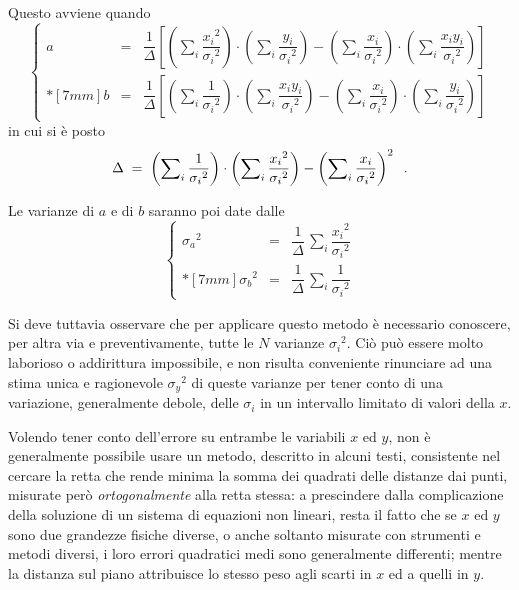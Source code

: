 Questo avviene quando
\begin{equation*}
  \left \{ \begin{array}{ccl}
    a & = & \dfrac{1}{\Delta}
      \left[ \left( \sum \nolimits_i
      \dfrac{{x_i}^2}{{\sigma_i}^2} \right)
      \cdot \left( \sum \nolimits_i
      \dfrac{y_i}{{\sigma_i}^2} \right) -
      \left( \sum \nolimits_i
      \dfrac{x_i}{{\sigma_i}^2} \right)
      \cdot \left( \sum \nolimits_i
      \dfrac{x_i y_i}{{\sigma_i}^2}
      \right) \right] \\*[7mm]
    b & = & \dfrac{1}{\Delta}
      \left[ \left( \sum \nolimits_i
      \dfrac{1}{{\sigma_i}^2} \right) \cdot
      \left( \sum \nolimits_i
      \dfrac{x_i y_i}{{\sigma_i}^2} \right)
      - \left( \sum \nolimits_i
      \dfrac{x_i}{{\sigma_i}^2} \right) \cdot
      \left( \sum \nolimits_i
      \dfrac{y_i}{{\sigma_i}^2} \right)
      \right]
    \end{array} \right.
\end{equation*}
in cui si \`e posto
\begin{equation*}
  \Delta \; = \; \left( \sum \nolimits_i
    \frac{1}{{\sigma_i}^2} \right) \cdot
    \left( \sum \nolimits_i \frac{{x_i}^2}
    {{\sigma_i}^2}  \right) - \left(
    \sum\nolimits_i \frac{x_i}{{\sigma_i}^2}
    \right) ^2 \;\; .
\end{equation*}

Le varianze di $a$ e di $b$ saranno poi date dalle
\begin{equation*}
  \left\{
  \begin{array}{ccl}
    {\sigma_a}^2 & = & \dfrac{1}{\Delta} \,
      \sum \nolimits_i \dfrac{{x_i}^2}{{\sigma_i}^2}
      \\*[7mm]
    {\sigma_b}^2 & = & \dfrac{1}{\Delta} \,
      \sum \nolimits_i \dfrac{1}{{\sigma_i}^2}
  \end{array}
  \right.
\end{equation*}

Si deve tuttavia osservare che per applicare questo metodo
\`e necessario conoscere, per altra via e preventivamente,
tutte le $N$ varianze ${\sigma_i}^2$.  Ci\`o pu\`o essere
molto laborioso o addirittura impossibile, e non risulta
conveniente rinunciare ad una stima unica e ragionevole
${\sigma_y}^2$ di queste varianze per tener conto di una
variazione, generalmente debole, delle $\sigma_i$ in un
intervallo limitato di valori della $x$.

Volendo tener conto dell'errore su entrambe le variabili $x$
ed $y$, non \`e generalmente possibile usare un metodo,
descritto in alcuni testi, consistente nel cercare la retta
che rende minima la somma dei quadrati delle distanze dai
punti, misurate per\`o \emph{ortogonalmente} alla retta
stessa: a prescindere dalla complicazione della soluzione di
un sistema di equazioni non lineari, resta il fatto che se
$x$ ed $y$ sono due grandezze fisiche diverse, o anche
soltanto misurate con strumenti e metodi diversi, i loro
errori quadratici medi sono generalmente differenti; mentre
la distanza sul piano attribuisce lo stesso peso agli scarti
in $x$ ed a quelli in $y$.

